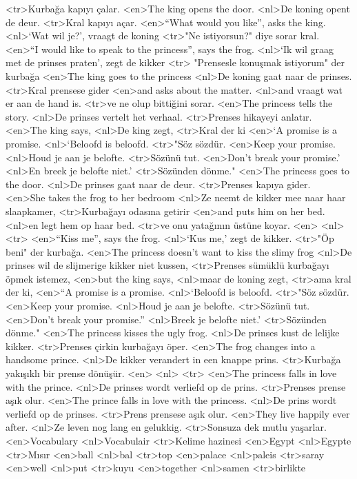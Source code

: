<tr>Kurbağa kapıyı çalar.
<en>The king opens the door.
<nl>De koning opent de deur.
<tr>Kral kapıyı açar.
<en>“What would you like”, asks the king.
<nl>`Wat wil je?', vraagt de koning
<tr>"Ne istiyorsun?" diye sorar kral.
<en>“I would like to speak to the princess”, says the frog.
<nl>`Ik wil graag met de prinses praten', zegt de kikker
<tr> "Prensesle konuşmak istiyorum" der kurbağa
<en>The king goes to the princess
<nl>De koning gaat naar de prinses.
<tr>Kral prensese gider
<en>and asks about the matter.
<nl>and vraagt wat er aan de hand is.
<tr>ve ne olup bittiğini sorar.
<en>The princess tells the story.
<nl>De prinses vertelt het verhaal.
<tr>Prenses hikayeyi anlatır.
<en>The king says,
<nl>De king zegt,
<tr>Kral der ki
<en>`A promise is a promise.
<nl>`Beloofd is beloofd.
<tr>"Söz sözdür.
<en>Keep your promise.
<nl>Houd je aan je belofte.
<tr>Sözünü tut.
<en>Don’t break your promise.'
<nl>En breek je belofte niet.'
<tr>Sözünden dönme."
<en>The princess goes to the door.
<nl>De prinses gaat naar de deur.
<tr>Prenses kapıya gider.
<en>She takes the frog to her bedroom
<nl>Ze neemt de kikker mee naar haar slaapkamer,
<tr>Kurbağayı odasına getirir
<en>and puts him on her bed. 
<nl>en legt hem op haar bed.
<tr>ve onu yatağının üstüne koyar.
<en>
<nl>
<tr>
<en>“Kiss me”, says the frog.
<nl>`Kus me,' zegt de kikker.
<tr>"Öp beni" der kurbağa.
<en>The princess doesn’t want to kiss the slimy frog
<nl>De prinses wil de slijmerige kikker niet kussen,
<tr>Prenses sümüklü kurbağayı öpmek istemez, 
<en>but the king says,
<nl>maar de koning zegt,
<tr>ama kral der ki,
<en>“A promise is a promise.
<nl>`Beloofd is beloofd.
<tr>"Söz sözdür.
<en>Keep your promise.
<nl>Houd je aan je belofte.
<tr>Sözünü tut.
<en>Don’t break your promise.”
<nl>Breek je belofte niet.'
<tr>Sözünden dönme."
<en>The princess kisses the ugly frog.
<nl>De prinses kust de lelijke kikker.
<tr>Prenses çirkin kurbağayı öper.
<en>The frog changes into a handsome prince.
<nl>De kikker verandert in een knappe prins.
<tr>Kurbağa yakışıklı bir prense dönüşür.
<en>
<nl>
<tr>
<en>The princess falls in love  with the prince.
<nl>De prinses wordt verliefd op de prins.
<tr>Prenses prense aşık olur.
<en>The prince falls in love with the princess.
<nl>De prins wordt verliefd op de prinses.
<tr>Prens prensese aşık olur.
<en>They live happily ever after.
<nl>Ze leven nog lang en gelukkig.
<tr>Sonsuza dek mutlu yaşarlar.
<en>Vocabulary
<nl>Vocabulair
<tr>Kelime hazinesi
<en>Egypt
<nl>Egypte
<tr>Mısır
<en>ball
<nl>bal
<tr>top
<en>palace
<nl>paleis
<tr>saray
<en>well
<nl>put
<tr>kuyu
<en>together
<nl>samen
<tr>birlikte
